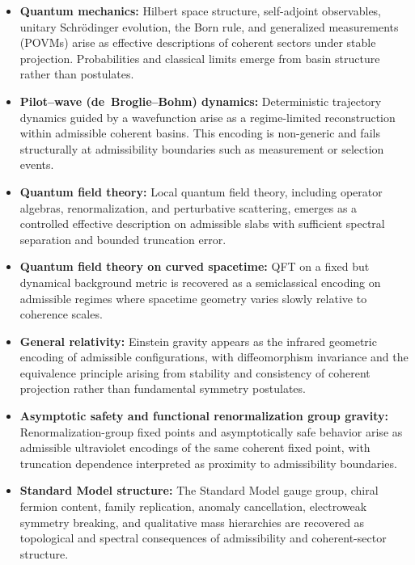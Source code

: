 \documentclass[11pt]{article}
\begin{document}
\begin{itemize}

\item \textbf{Quantum mechanics:}
Hilbert space structure, self-adjoint observables, unitary Schr\"odinger evolution, the Born
rule, and generalized measurements (POVMs) arise as effective descriptions of coherent
sectors under stable projection. Probabilities and classical limits emerge from basin
structure rather than postulates.

\item \textbf{Pilot--wave (de~Broglie--Bohm) dynamics:}
Deterministic trajectory dynamics guided by a wavefunction arise as a regime-limited
reconstruction within admissible coherent basins. This encoding is non-generic and fails
structurally at admissibility boundaries such as measurement or selection events.

\item \textbf{Quantum field theory:}
Local quantum field theory, including operator algebras, renormalization, and perturbative
scattering, emerges as a controlled effective description on admissible slabs with sufficient
spectral separation and bounded truncation error.

\item \textbf{Quantum field theory on curved spacetime:}
QFT on a fixed but dynamical background metric is recovered as a semiclassical encoding
on admissible regimes where spacetime geometry varies slowly relative to coherence scales.

\item \textbf{General relativity:}
Einstein gravity appears as the infrared geometric encoding of admissible configurations,
with diffeomorphism invariance and the equivalence principle arising from stability and
consistency of coherent projection rather than fundamental symmetry postulates.

\item \textbf{Asymptotic safety and functional renormalization group gravity:}
Renormalization-group fixed points and asymptotically safe behavior arise as admissible
ultraviolet encodings of the same coherent fixed point, with truncation dependence
interpreted as proximity to admissibility boundaries.

\item \textbf{Standard Model structure:}
The Standard Model gauge group, chiral fermion content, family replication, anomaly
cancellation, electroweak symmetry breaking, and qualitative mass hierarchies are recovered
as topological and spectral consequences of admissibility and coherent-sector structure.


\end{itemize}
\end{document}
